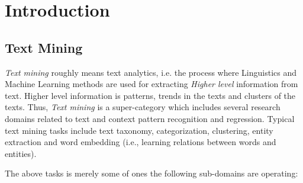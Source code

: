 
\chapter{Introduction}

\label{chap:introduction}


\newcommand{\keyword}[1]{\textbf{#1}}
\newcommand{\tabhead}[1]{\textbf{#1}}
\newcommand{\code}[1]{\texttt{#1}}
\newcommand{\file}[1]{\texttt{\bfseries#1}}
\newcommand{\option}[1]{\texttt{\itshape#1}}


\section{Text Mining} \label{chap:introduction:sec:text_mining}

\textit{Text mining} roughly means text analytics, i.e. the process where Linguistics and Machine Learning methods are used for extracting \textit{Higher level} information from text. Higher level information is patterns, trends in the texts and clusters of the texts. Thus, \textit{Text mining} is a super-category which includes several research domains related to text and context pattern recognition and regression. Typical text mining tasks include text taxonomy, categorization, clustering, entity extraction and word embedding (i.e., learning relations between words and entities).

The above tasks is merely some of ones the following sub-domains are operating: 

